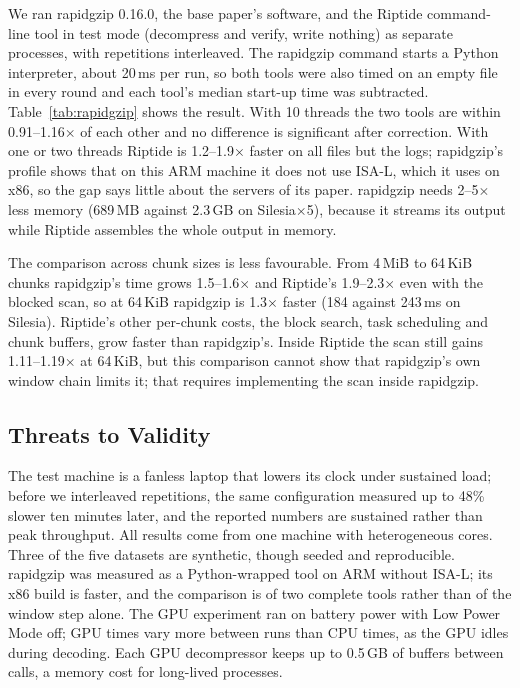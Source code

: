 \documentclass[conference]{IEEEtran}
\begin{document}
We ran rapidgzip 0.16.0, the base paper's software, and the Riptide command-line
tool in test mode (decompress and verify, write nothing) as separate processes,
with repetitions interleaved. The rapidgzip command starts a Python interpreter,
about 20\,ms per run, so both tools were also timed on an empty file in every round
and each tool's median start-up time was subtracted. Table~\ref{tab:rapidgzip} shows
the result. With 10 threads the two tools are within 0.91--1.16$\times$ of each
other and no difference is significant after correction. With one or two threads
Riptide is 1.2--1.9$\times$ faster on all files but the logs; rapidgzip's profile
shows that on this ARM machine it does not use ISA-L, which it uses on x86, so the
gap says little about the servers of its paper. rapidgzip needs 2--5$\times$ less
memory (689\,MB against 2.3\,GB on Silesia$\times$5), because it streams its output
while Riptide assembles the whole output in memory.

The comparison across chunk sizes is less favourable. From 4\,MiB to 64\,KiB
chunks rapidgzip's time grows 1.5--1.6$\times$ and Riptide's 1.9--2.3$\times$ even with
the blocked scan, so at 64\,KiB rapidgzip is 1.3$\times$ faster (184 against 243\,ms
on Silesia). Riptide's other per-chunk costs, the block search, task scheduling and
chunk buffers, grow faster than rapidgzip's. Inside Riptide the scan still gains
1.11--1.19$\times$ at 64\,KiB, but this comparison cannot show that rapidgzip's own
window chain limits it; that requires implementing the scan inside rapidgzip.

\subsection{Threats to Validity}

The test machine is a fanless laptop that lowers its clock under sustained load;
before we interleaved repetitions, the same configuration measured up to 48\% slower
ten minutes later, and the reported numbers are sustained rather than peak
throughput. All results come from one machine with heterogeneous cores. Three of the
five datasets are synthetic, though seeded and reproducible. rapidgzip was measured
as a Python-wrapped tool on ARM without ISA-L; its x86 build is faster, and the
comparison is of two complete tools rather than of the window step alone. The GPU
experiment ran on battery power with Low Power Mode off; GPU times vary more between
runs than CPU times, as the GPU idles during decoding. Each GPU decompressor keeps up
to 0.5\,GB of buffers between calls, a memory cost for long-lived processes.
\end{document}
